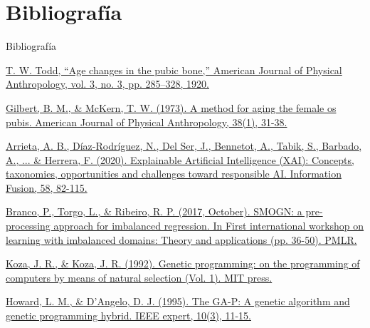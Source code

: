 \documentclass{beamer}
\begin{document}
\section{Bibliografía}
\begin{frame}[allowframebreaks]{Bibliografía}

\begin{thebibliography}{9}


	\href{https://onlinelibrary.wiley.com/doi/abs/10.1002/ajpa.1330030301}{\scriptsize T. W. Todd, “Age changes in the pubic bone,” American Journal of Physical Anthropology, vol. 3, no. 3, pp. 285–328, 1920.}


	\href{https://onlinelibrary.wiley.com/doi/abs/10.1002/ajpa.1330380109}{\scriptsize Gilbert, B. M., \& McKern, T. W. (1973). A method for aging the female os pubis. American Journal of Physical Anthropology, 38(1), 31-38.}


	\href{https://www.sciencedirect.com/science/article/pii/S1566253519308103}{\scriptsize Arrieta, A. B., Díaz-Rodríguez, N., Del Ser, J., Bennetot, A., Tabik, S., Barbado, A., ... \& Herrera, F. (2020). Explainable Artificial Intelligence (XAI): Concepts, taxonomies, opportunities and challenges toward responsible AI. Information Fusion, 58, 82-115.}


	\href{http://proceedings.mlr.press/v74/branco17a/branco17a.pdf}{\scriptsize Branco, P., Torgo, L., \& Ribeiro, R. P. (2017, October). SMOGN: a pre-processing approach for imbalanced regression. In First international workshop on learning with imbalanced domains: Theory and applications (pp. 36-50). PMLR.}


	\href{https://mitpress.mit.edu/books/genetic-programming}{\scriptsize Koza, J. R., \& Koza, J. R. (1992). Genetic programming: on the programming of computers by means of natural selection (Vol. 1). MIT press.}


	\href{https://ieeexplore.ieee.org/stamp/stamp.jsp?tp=&arnumber=393137}{\scriptsize Howard, L. M., \& D'Angelo, D. J. (1995). The GA-P: A genetic algorithm and genetic programming hybrid. IEEE expert, 10(3), 11-15.}





\end{thebibliography}
\end{frame}
\end{document}
